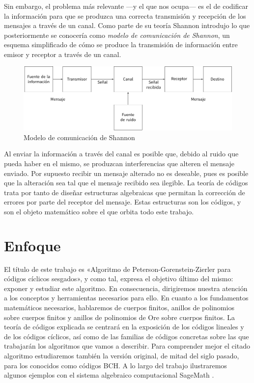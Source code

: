 Sin embargo, el problema más relevante —y el que nos ocupa— es el de codificar la información para que se produzca una correcta transmisión y recepción de los mensajes a través de un canal.
Como parte de su teoría Shannon introdujo lo que posteriormente se conocería como \emph{modelo de comunicación de Shannon}, un esquema simplificado de cómo se produce la transmisión de información entre emisor y receptor a través de un canal.
\begin{figure}
  \includegraphics[width=\textwidth]{assets/shannon-communication-model.pdf}
  \caption*{Modelo de comunicación de Shannon}
\end{figure}
Al enviar la información a través del canal es posible que, debido al ruido que pueda haber en el mismo, se produzcan interferencias que alteren el mensaje enviado.
Por supuesto recibir un mensaje alterado no es deseable, pues es posible que la alteración sea tal que el mensaje recibido sea ilegible.
La teoría de códigos trata por tanto de diseñar estructuras algebraicas que permitan la corrección de errores por parte del receptor del mensaje.
Estas estructuras son los códigos, y son el objeto matemático sobre el que orbita todo este trabajo.

\section*{Enfoque}

El título de este trabajo es «Algoritmo de Peterson-Gorenstein-Zierler para códigos cíclicos sesgados», y como tal, expresa el objetivo último del mismo: exponer y estudiar este algoritmo.
En consecuencia, dirigiremos nuestra atención a los conceptos y herramientas necesarios para ello.
En cuanto a los fundamentos matemáticos necesarios, hablaremos de cuerpos finitos, anillos de polinomios sobre cuerpos finitos y anillos de polinomios de Ore sobre cuerpos finitos.
La teoría de códigos explicada se centrará en la exposición de los códigos lineales y de los códigos cíclicos, así como de las familias de códigos concretas sobre las que trabajarán los algoritmos que vamos a describir.
Para comprender mejor el citado algoritmo estudiaremos también la versión original, de mitad del siglo pasado, para los conocidos como códigos BCH.
A lo largo del trabajo ilustraremos algunos ejemplos con el sistema algebraico computacional SageMath \parencite{the_sage_developers_sagemath_2020}.

